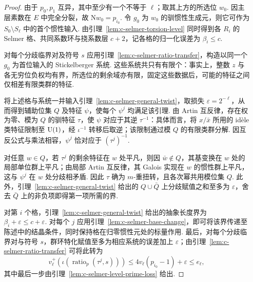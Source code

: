 \begin{proof}
由于 $p_0,p_1$ 互异，其中至少有一个不等于 $\ell$；取其上方的所选位 $w_0$. 因主层素数在 $E$ 中完全分裂，故 $\mathrm Nw_0=p_{i_0}$. 令 $g_0$ 为 $w_0$ 的驯惯性生成元，则它可作为 $S_0\setminus S_\ell$ 中的首个惯性输入. 由引理~\ref{lem:c-selmer-torsion-level} 同时得到各 $R_i$ 的 Selmer 格、共同系数环与挠系数层 $c+2$，记各格的归一化误差为 $\beta_i\le c$.

对每个分歧临界对及符号 $s$ 应用引理~\ref{lem:c-selmer-ratio-transfer}，构造以同一个 $g_0$ 为首位输入的 Stickelberger 系统. 这些系统共只有有限个：事实上，整数 $z$ 与各无穷位负权均有界，所选位的剩余域亦有限，固定这些数据后，可能的特征之间仅相差有限类群的特征.

将上述格与系统一并输入引理~\ref{lem:c-selmer-general-twist}，取损失 $\varepsilon=2^{-\ell}$，从而得到辅助位集 $Q$ 及特征 $\psi$，使每个 $\psi^j$ 均满足该引理. 由 Artin 互反律，存在权为零、模为 $Q$ 的驯特征 $\tau$，使 $\psi$ 对应于其逆 $\tau^{-1}$：具体而言，将 $x/\bar x$ 所用的 idèle 类特征限制至 $\operatorname{U}(1)$，经 $\iota^{-1}$ 转移后取逆；该限制通过模 $Q$ 的有限类群分解. 因互反公式与乘法相容，$\psi^j$ 恰对应于 $(\tau^j)^{-1}$.

对任意 $w\in Q$，若 $\tau^j$ 的剩余特征在 $w$ 处平凡，则因 $\bar w\notin Q$，其基变换在 $w$ 处的局部单位群上平凡；由局部 Artin 互反律，其 Galois 实现在 $w$ 的惯性群上平凡，这与 $\psi^j$ 在 $w$ 处分歧相矛盾. 因此 $\tau$ 确为 $m$-重扭转，且各次幂共用模位集 $Q$. 此外，引理~\ref{lem:c-selmer-general-twist} 给出的 $Q\cup\bar Q$ 上分歧赋值之和至多为 $\varepsilon$，舍去 $\bar Q$ 上的非负项即得第一项所需的界.

对第 $i$ 个格，引理~\ref{lem:c-selmer-general-twist} 给出的抽象长度界为 $\beta_i+\varepsilon\le c+\varepsilon$. 对每个 $j$ 应用引理~\ref{lem:c-selmer-base-change}，即可将该界传递至陈述中的结晶条件，同时保持格在归零惯性元处的标量作用.
最后，对每个分歧临界对与符号 $s$，群环特化赋值至多为相应系统的误差加上 $\varepsilon$；由引理~\ref{lem:c-selmer-ratio-transfer} 可将此转为
\[
 v_\ell^+(\iota(\operatorname{ratio}_p(\tau^j,s)))
 \le4v_\ell(p_{i_0}-1)+\varepsilon\le e_\ell,
\]
其中最后一步由引理~\ref{lem:c-selmer-level-prime-loss} 给出.
\end{proof}


